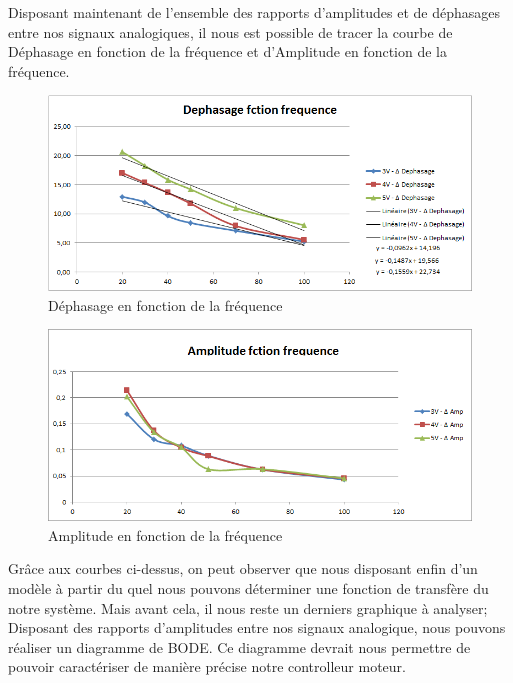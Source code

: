 \documentclass[french,a4paper,12pt]{report}
\begin{document}
	Disposant maintenant de l'ensemble des rapports d'amplitudes et de déphasages entre nos signaux analogiques, il nous est possible de tracer la courbe de Déphasage en fonction de la fréquence et d'Amplitude en fonction de la fréquence.
	 	
		\begin{figure}[!ht]
    \center
  	\includegraphics[width=15cm]{dFctionFreq.png}
    \caption{Déphasage en fonction de la fréquence}
	\end{figure}	
	
	\begin{figure}[!ht]
    \center
  	\includegraphics[width=15cm]{AFctionFreq.png}
    \caption{Amplitude en fonction de la fréquence}
	\end{figure}
	
	Grâce aux courbes ci-dessus, on peut observer que nous disposant enfin d'un modèle à partir du quel nous pouvons déterminer une fonction de transfère du notre système. Mais avant cela, il nous reste un derniers graphique à analyser; Disposant des rapports d'amplitudes entre nos signaux analogique, nous pouvons réaliser un diagramme de BODE. Ce diagramme devrait nous permettre de pouvoir caractériser de manière précise notre controlleur moteur.
	
\end{document}
